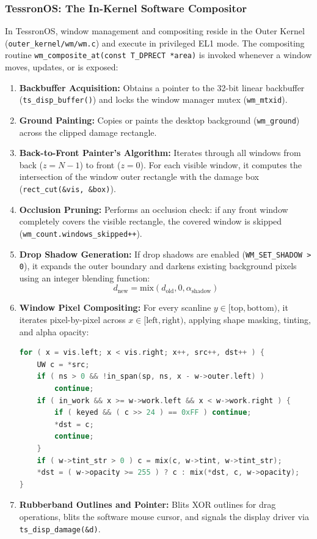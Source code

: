 \documentclass[10pt,journal,compsoc,twocolumn]{article}
\begin{document}
\subsubsection{TessronOS: The In-Kernel Software Compositor}
In TessronOS, window management and compositing reside in the Outer Kernel (\texttt{outer\_kernel/wm/wm.c}) and execute in privileged EL1 mode. The compositing routine \texttt{wm\_composite\_at(const T\_DPRECT *area)} is invoked whenever a window moves, updates, or is exposed:
\begin{enumerate}[leftmargin=*]
    \item \textbf{Backbuffer Acquisition:} Obtains a pointer to the 32-bit linear backbuffer (\texttt{ts\_disp\_buffer()}) and locks the window manager mutex (\texttt{wm\_mtxid}).
    \item \textbf{Ground Painting:} Copies or paints the desktop background (\texttt{wm\_ground}) across the clipped damage rectangle.
    \item \textbf{Back-to-Front Painter's Algorithm:} Iterates through all windows from back ($z = N-1$) to front ($z = 0$). For each visible window, it computes the intersection of the window outer rectangle with the damage box (\texttt{rect\_cut(\&vis, \&box)}).
    \item \textbf{Occlusion Pruning:} Performs an occlusion check: if any front window completely covers the visible rectangle, the covered window is skipped (\texttt{wm\_count.windows\_skipped++}).
    \item \textbf{Drop Shadow Generation:} If drop shadows are enabled (\texttt{WM\_SET\_SHADOW > 0}), it expands the outer boundary and darkens existing background pixels using an integer blending function:
    \begin{equation}
    d_{\text{new}} = \text{mix}(d_{\text{old}}, 0, \alpha_{\text{shadow}})
    \end{equation}
    \item \textbf{Window Pixel Compositing:} For every scanline $y \in [\text{top}, \text{bottom})$, it iterates pixel-by-pixel across $x \in [\text{left}, \text{right})$, applying shape masking, tinting, and alpha opacity:
    \begin{lstlisting}[language=C]
for ( x = vis.left; x < vis.right; x++, src++, dst++ ) {
    UW c = *src;
    if ( ns > 0 && !in_span(sp, ns, x - w->outer.left) )
        continue;
    if ( in_work && x >= w->work.left && x < w->work.right ) {
        if ( keyed && ( c >> 24 ) == 0xFF ) continue;
        *dst = c;
        continue;
    }
    if ( w->tint_str > 0 ) c = mix(c, w->tint, w->tint_str);
    *dst = ( w->opacity >= 255 ) ? c : mix(*dst, c, w->opacity);
}
    \end{lstlisting}
    \item \textbf{Rubberband Outlines and Pointer:} Blits XOR outlines for drag operations, blits the software mouse cursor, and signals the display driver via \texttt{ts\_disp\_damage(\&d)}.
\end{enumerate}
\end{document}
